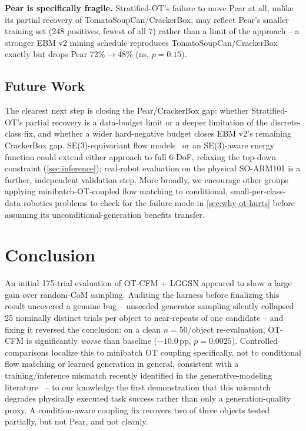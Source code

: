 \documentclass[journal]{IEEEtran}
\begin{document}
\noindent\textbf{Pear is specifically fragile.} Stratified-OT's failure to
move Pear at all, unlike its partial recovery of TomatoSoupCan/CrackerBox,
may reflect Pear's smaller training set (248 positives, fewest of all 7)
rather than a limit of the approach -- a stronger EBM v2 mining schedule
reproduces TomatoSoupCan/CrackerBox exactly but drops Pear 72\%$\to$48\%
(ns, $p{=}0.15$).

\subsection{Future Work}
\label{sec:future}

The clearest next step is closing the Pear/CrackerBox gap: whether
Stratified-OT's partial recovery is a data-budget limit or a deeper
limitation of the discrete-class fix, and whether a wider hard-negative
budget closes EBM v2's remaining CrackerBox gap. SE(3)-equivariant flow
models~\cite{chen2024rfm} or an SE(3)-aware energy function could extend
either approach to full 6-DoF, relaxing the top-down constraint
(\cref{sec:inference}); real-robot evaluation on the physical SO-ARM101 is a
further, independent validation step. More broadly, we encourage other
groups applying minibatch-OT-coupled flow matching to conditional,
small-per-class-data robotics problems to check for the failure mode in
\cref{sec:why-ot-hurts} before assuming its unconditional-generation
benefits transfer.

\section{Conclusion}
\label{sec:conclusion}

An initial 175-trial evaluation of OT-CFM + LGGSN appeared to show a large
gain over random-CoM sampling. Auditing the harness before finalizing this
result uncovered a genuine bug -- unseeded generator sampling silently
collapsed 25 nominally distinct trials per object to near-repeats of one
candidate -- and fixing it reversed the conclusion: on a clean $n{=}50$/object
re-evaluation, OT-CFM is significantly \emph{worse} than baseline
($-10.0$\,pp, $p{=}0.0025$). Controlled comparisons localize this to
minibatch OT coupling specifically, not to conditional flow matching or
learned generation in general, consistent with a training/inference
mismatch recently identified in the generative-modeling
literature~\cite{cheng2025curse} -- to our knowledge the first demonstration
that this mismatch degrades physically executed task success rather than
only a generation-quality proxy. A condition-aware coupling fix recovers two
of three objects tested partially, but not Pear, and not cleanly.
\end{document}
